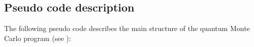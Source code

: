 %
\subsection{Pseudo code description}\label{sec:pseudocode}
%
The following pseudo code describes the main structure of the quantum Monte Carlo program (see ):
% 
% 
% 
% 
% 
%    
%       
%          
